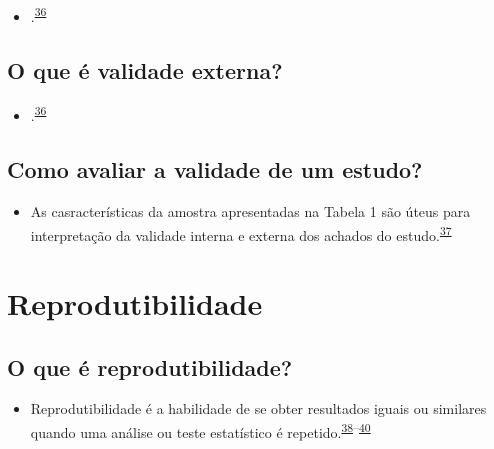 \documentclass[
  a4paper,
]{book}
\providecommand{\tightlist}{%
  \setlength{\itemsep}{0pt}\setlength{\parskip}{0pt}}
\begin{document}
\begin{itemize}
\tightlist
\item
  .\textsuperscript{\protect\hyperlink{ref-findley2021}{36}}
\end{itemize}

\hypertarget{o-que-uxe9-validade-externa}{%
\subsection{O que é validade externa?}\label{o-que-uxe9-validade-externa}}

\begin{itemize}
\tightlist
\item
  .\textsuperscript{\protect\hyperlink{ref-findley2021}{36}}
\end{itemize}

\hypertarget{como-avaliar-a-validade-de-um-estudo}{%
\subsection{Como avaliar a validade de um estudo?}\label{como-avaliar-a-validade-de-um-estudo}}

\begin{itemize}
\tightlist
\item
  As casracterísticas da amostra apresentadas na Tabela 1 são úteus para interpretação da validade interna e externa dos achados do estudo.\textsuperscript{\protect\hyperlink{ref-Westreich2013}{37}}
\end{itemize}

\hypertarget{reprodutibilidade}{%
\section{Reprodutibilidade}\label{reprodutibilidade}}

\hypertarget{o-que-uxe9-reprodutibilidade}{%
\subsection{O que é reprodutibilidade?}\label{o-que-uxe9-reprodutibilidade}}

\begin{itemize}
\tightlist
\item
  Reprodutibilidade é a habilidade de se obter resultados iguais ou similares quando uma análise ou teste estatístico é repetido.\textsuperscript{\protect\hyperlink{ref-resnik2016}{38}--\protect\hyperlink{ref-mair2016}{40}}
\end{itemize}
\end{document}
